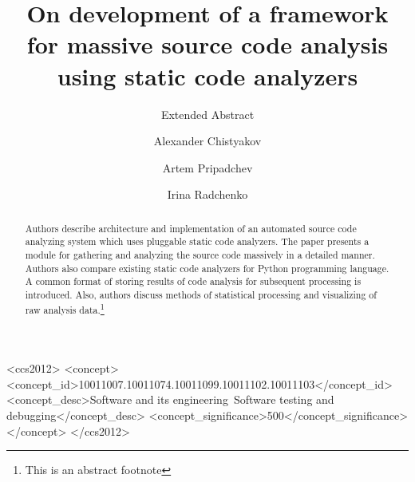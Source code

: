 \documentclass[sigconf]{acmart}
\begin{document}
\title{On development of a framework\\for massive source code analysis\\
using static code analyzers}
\subtitle{Extended Abstract}


\author{Alexander Chistyakov}
\authornote{}

\author{Artem Pripadchev}
\authornote{}

\author{Irina Radchenko}
\authornote{}

\renewcommand{\shortauthors}{A. Chistyakov et al.}


\begin{abstract}
Authors describe architecture and implementation of an automated source code analyzing system which uses pluggable static code analyzers. The paper presents a module for gathering and analyzing the source code massively in a detailed manner.
Authors also compare existing static code analyzers for Python programming language. A common format of storing results of code analysis for subsequent processing is introduced. Also, authors discuss methods of statistical processing and visualizing of raw analysis data.\footnote{This is an abstract footnote}
\end{abstract}

%
%
\begin{CCSXML}
<ccs2012>
<concept>
<concept_id>10011007.10011074.10011099.10011102.10011103</concept_id>
<concept_desc>Software and its engineering~Software testing and debugging</concept_desc>
<concept_significance>500</concept_significance>
</concept>
</ccs2012>
\end{CCSXML}




\maketitle




 
\end{document}
